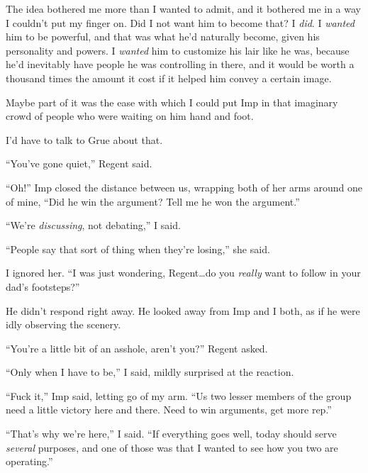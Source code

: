 The idea bothered me more than I wanted to admit, and it bothered me in a way I couldn't put my finger on.  Did I not want him to become that?  I \emph{did}.  I \emph{wanted }him to be powerful, and that was what he'd naturally become, given his personality and powers.  I \emph{wanted }him to customize his lair like he was, because he'd inevitably have people he was controlling in there, and it would be worth a thousand times the amount it cost if it helped him convey a certain image.



Maybe part of it was the ease with which I could put Imp in that imaginary crowd of people who were waiting on him hand and foot.



I'd have to talk to Grue about that.



``You've gone quiet,'' Regent said.



``Oh!'' Imp closed the distance between us, wrapping both of her arms around one of mine, ``Did he win the argument?  Tell me he won the argument.''



``We're \emph{discussing}, not debating,'' I said.



``People say that sort of thing when they're losing,'' she said.



I ignored her.  ``I was just wondering, Regent\ldots do you \emph{really} want to follow in your dad's footsteps?''



He didn't respond right away.  He looked away from Imp and I both, as if he were idly observing the scenery.



``You're a little bit of an asshole, aren't you?'' Regent asked.



``Only when I have to be,'' I said, mildly surprised at the reaction.



``Fuck it,'' Imp said, letting go of my arm.  ``Us two lesser members of the group need a little victory here and there.  Need to win arguments, get more rep.''



``That's why we're here,'' I said.  ``If everything goes well, today should serve \emph{several} purposes, and one of those was that I wanted to see how you two are operating.''



